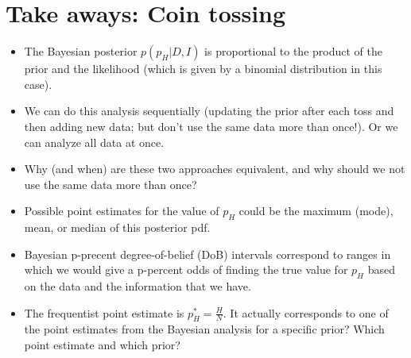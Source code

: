 \documentclass[%
oneside,                 %
final,                   %
10pt]{article}
\begin{document}
\section{Take aways: Coin tossing}

\begin{itemize}
\item The Bayesian posterior $p(p_H | D, I)$ is proportional to the product of the prior and the likelihood (which is given by a binomial distribution in this case).

\item We can do this analysis sequentially (updating the prior after each toss and then adding new data; but don't use the same data more than once!). Or we can analyze all data at once. 

\item Why (and when) are these two approaches equivalent, and why should we not use the same data more than once?
\end{itemize}

\noindent

\begin{itemize}
\item Possible point estimates for the value of $p_H$ could be the maximum (mode), mean, or median of this posterior pdf. 

\item Bayesian p-precent degree-of-belief (DoB) intervals correspond to ranges in which we would give a p-percent odds of finding the true value for $p_H$ based on the data and the information that we have.

\item The frequentist point estimate is $p_H^* = \frac{H}{N}$. It actually corresponds to one of the point estimates from the Bayesian analysis for a specific prior? Which point estimate and which prior?
\end{itemize}

\noindent


\end{document}
